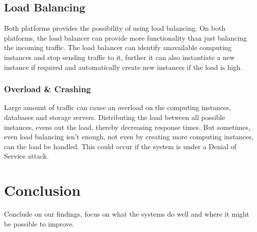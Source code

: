 \documentclass[11pt]{report}
\begin{document}
\section{Load Balancing}
Both platforms provides the possibility of using load balancing. On both platforms, the load balancer can provide more functionality than just balancing the incoming traffic. The load balancer can identify unavailable computing instances and stop sending traffic to it, further it can also instantiate a new instance if required and automatically create new instances if the load is high.

\subsection{Overload \& Crashing}
Large amount of traffic can cause an overload on the computing instances, databases and storage servers. Distributing the load between all possible instances, evens out the load, thereby decreasing response times. But sometimes, even load balancing isn't enough, not even by creating more computing instances, can the load be handled. This could occur if the system is under a Denial of Service attack. 


\chapter{Conclusion}
Conclude on our findings, focus on what the systems do well and where it might be possible to improve.
\end{document}
